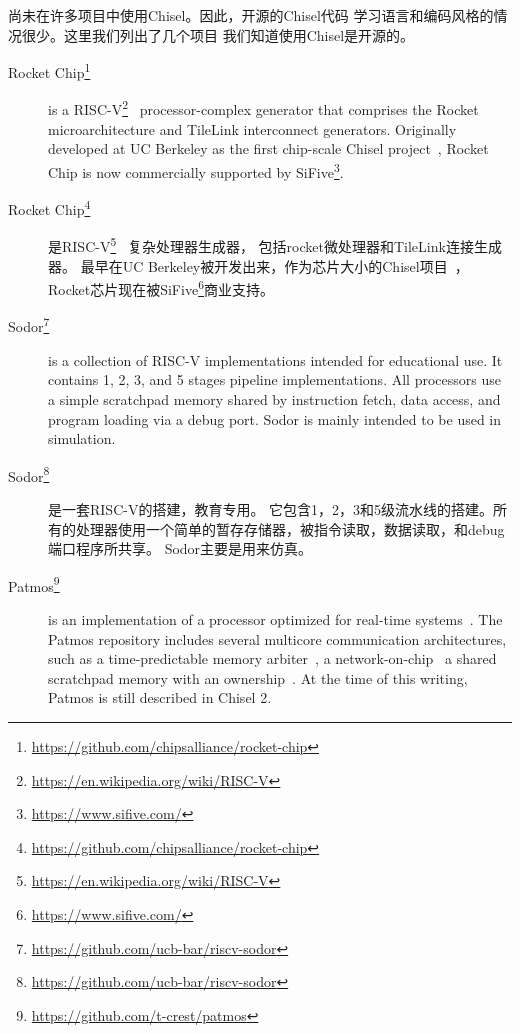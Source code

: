 \documentclass[%
    10pt,
    headinclude, footexclude,
    openright, %
    notitlepage,
    cleardoubleempty,
    headsepline,
    pointlessnumbers,
    bibtotoc, idxtotoc,
    ]{scrbook}
\newcommand{\myref}[2]{\href{#1}{#2}}
\renewcommand{\myref}[2]{{#2}{\footnote{\url{#1}}}}
\begin{document}
{尚未在许多项目中使用Chisel。因此，开源的Chisel代码
学习语言和编码风格的情况很少。这里我们列出了几个项目
我们知道使用Chisel是开源的。

\begin{description}

\item[\myref{https://github.com/chipsalliance/rocket-chip}{Rocket Chip}]
is a \myref{https://en.wikipedia.org/wiki/RISC-V}{RISC-V}~\cite{risc-v}
processor-complex generator that comprises the Rocket
microarchitecture and TileLink interconnect generators.  Originally developed
at UC Berkeley as the first chip-scale Chisel project~\cite{rocket:techrep}, Rocket Chip is now
commercially supported by \myref{https://www.sifive.com/}{SiFive}.

\item[\myref{https://github.com/chipsalliance/rocket-chip}{Rocket Chip}]
是\myref{https://en.wikipedia.org/wiki/RISC-V}{RISC-V}~\cite{risc-v}
复杂处理器生成器， 包括rocket微处理器和TileLink连接生成器。 
最早在UC Berkeley被开发出来，作为芯片大小的Chisel项目~\cite{rocket:techrep}，
Rocket芯片现在被\myref{https://www.sifive.com/}{SiFive}商业支持。


\item[\myref{https://github.com/ucb-bar/riscv-sodor}{Sodor}] is a collection of RISC-V
implementations intended for educational use. It contains 1, 2, 3, and 5 stages pipeline
implementations. All processors use a simple scratchpad memory shared by instruction
fetch, data access, and program loading via a debug port. Sodor is mainly intended to
be used in simulation.

\item[\myref{https://github.com/ucb-bar/riscv-sodor}{Sodor}]是一套RISC-V的搭建，教育专用。
它包含1，2，3和5级流水线的搭建。所有的处理器使用一个简单的暂存存储器，被指令读取，数据读取，和debug端口程序所共享。
Sodor主要是用来仿真。

\item[\myref{https://github.com/t-crest/patmos}{Patmos}] is an implementation of a
processor optimized for real-time systems~\cite{patmos:rts2018}. The Patmos repository
includes several multicore communication architectures, such as a time-predictable memory
arbiter~\cite{t-crest:memnoc}, a network-on-chip~\cite{s4nocni:arcs2019}
a shared scratchpad memory with an ownership~\cite{t-crest:ownspm}.
At the time of this writing, Patmos is still described in Chisel 2.


\end{description}}
\end{document}
